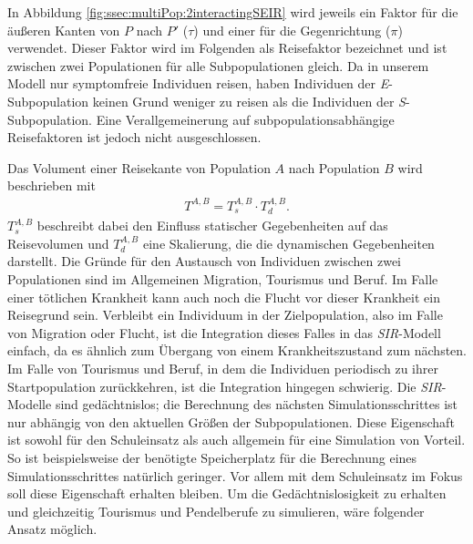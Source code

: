 In Abbildung \ref{fig:ssec:multiPop:2interactingSEIR} wird jeweils ein Faktor für die äußeren Kanten von $P$ nach $P'$ ($\tau$) und einer für die Gegenrichtung ($\pi$) verwendet. Dieser Faktor wird im Folgenden als Reisefaktor bezeichnet und ist zwischen zwei Populationen für alle Subpopulationen gleich. Da in unserem Modell nur symptomfreie Individuen reisen, haben Individuen der \emph{E}-Subpopulation keinen Grund weniger zu reisen als die Individuen der \emph{S}-Subpopulation. Eine Verallgemeinerung auf subpopulationsabhängige Reisefaktoren ist jedoch nicht ausgeschlossen. 

Das Volument einer Reisekante von Population $A$ nach Population $B$ wird beschrieben mit
\begin{align}
	T^{A,B} = T^{A,B}_{s} \cdot T^{A,B}_{d}. 
\end{align}
$T^{A,B}_s$ beschreibt dabei den Einfluss statischer Gegebenheiten auf das Reisevolumen und $T^{A,B}_d$ eine Skalierung, die die dynamischen Gegebenheiten darstellt. Die Gründe für den Austausch von Individuen zwischen zwei Populationen sind im Allgemeinen Migration, Tourismus und Beruf. Im Falle einer tötlichen Krankheit kann auch noch die Flucht vor dieser Krankheit ein Reisegrund sein. Verbleibt ein Individuum in der Zielpopulation, also im Falle von Migration oder Flucht, ist die Integration dieses Falles in das \emph{SIR}-Modell einfach, da es ähnlich zum Übergang von einem Krankheitszustand zum nächsten. Im Falle von Tourismus und Beruf, in dem die Individuen periodisch zu ihrer Startpopulation zurückkehren, ist die Integration hingegen schwierig. Die \emph{SIR}-Modelle sind gedächtnislos; die Berechnung des nächsten Simulationsschrittes ist nur abhängig von den aktuellen Größen der Subpopulationen. Diese Eigenschaft ist sowohl für den Schuleinsatz als auch allgemein für eine Simulation von Vorteil. So ist beispielsweise der benötigte Speicherplatz für die Berechnung eines Simulationsschrittes natürlich geringer. Vor allem mit dem Schuleinsatz im Fokus soll diese Eigenschaft erhalten bleiben. Um die Gedächtnislosigkeit zu erhalten und gleichzeitig Tourismus und Pendelberufe zu simulieren, wäre folgender Ansatz möglich.

